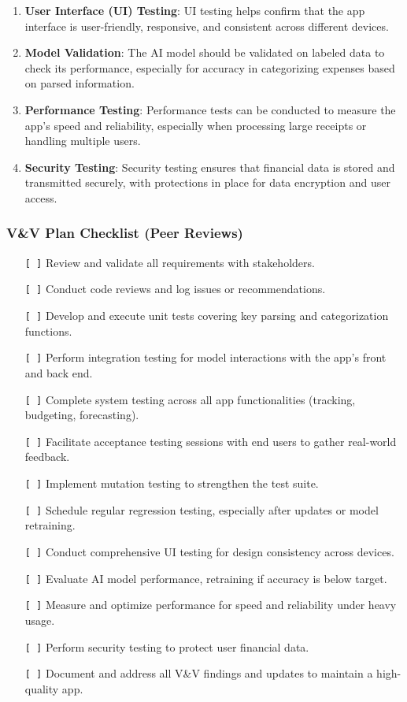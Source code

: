 \documentclass[12pt, titlepage]{article}
\begin{document}
\begin{enumerate}
	\item \textbf{User Interface (UI) Testing}: UI testing helps confirm that the app interface is user-friendly, responsive, and consistent across different devices.
	\item \textbf{Model Validation}: The AI model should be validated on labeled data to check its performance, especially for accuracy in categorizing expenses based on parsed information.
	\item \textbf{Performance Testing}: Performance tests can be conducted to measure the app's speed and reliability, especially when processing large receipts or handling multiple users.
	\item \textbf{Security Testing}: Security testing ensures that financial data is stored and transmitted securely, with protections in place for data encryption and user access.
\end{enumerate}

\newpage

\subsubsection{V\&V Plan Checklist (Peer Reviews)}

\begin{itemize}
	\item [\texttt{[ ]}] Review and validate all requirements with stakeholders.
	\item [\texttt{[ ]}] Conduct code reviews and log issues or recommendations.
	\item [\texttt{[ ]}] Develop and execute unit tests covering key parsing and categorization functions.
	\item [\texttt{[ ]}] Perform integration testing for model interactions with the app's front and back end.
	\item [\texttt{[ ]}] Complete system testing across all app functionalities (tracking, budgeting, forecasting).
	\item [\texttt{[ ]}] Facilitate acceptance testing sessions with end users to gather real-world feedback.
	\item [\texttt{[ ]}] Implement mutation testing to strengthen the test suite.
	\item [\texttt{[ ]}] Schedule regular regression testing, especially after updates or model retraining.
	\item [\texttt{[ ]}] Conduct comprehensive UI testing for design consistency across devices.
	\item [\texttt{[ ]}] Evaluate AI model performance, retraining if accuracy is below target.
	\item [\texttt{[ ]}] Measure and optimize performance for speed and reliability under heavy usage.
	\item [\texttt{[ ]}] Perform security testing to protect user financial data.
	\item [\texttt{[ ]}] Document and address all V\&V findings and updates to maintain a high-quality app.
\end{itemize}
\end{document}
